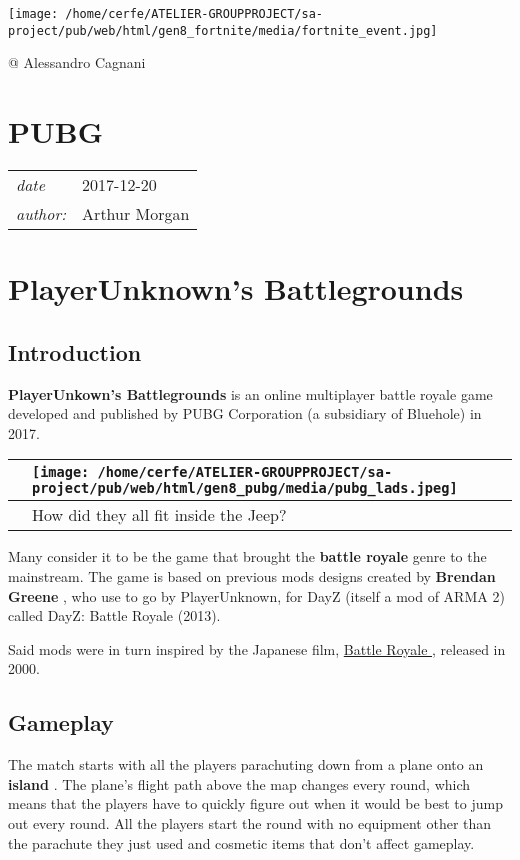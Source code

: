 \documentclass[a4paper,10pt]{book}
\newcommand{\pageHeader}[4]{
    \section{#1}
    \vspace{-0.3cm}
    \begin{table}[h!]
     \begin{tabular}{ll}
        \hline
        \textit{date} & #2 \\
        \textit{author: } & #3\\
        \hline
     \end{tabular}
    \end{table}
    \vspace{-0.3cm}
}
\begin{document}
 
 \texttt{[image: /home/cerfe/ATELIER-GROUPPROJECT/sa-project/pub/web/html/gen8\_fortnite/media/fortnite\_event.jpg]}
 
 
 @ Alessandro Cagnani 
 
 
 \newpage\pageHeader{PUBG}{2017-12-20}{Arthur Morgan}{The game that brought battle royale to the mainstream, PlayerUnknown's Battlegrounds}
 \section{PlayerUnknown's Battlegrounds }
 \subsection{Introduction }
 
 \textbf{PlayerUnkown's Battlegrounds }  is an online multiplayer battle royale game developed and published by PUBG Corporation (a subsidiary of Bluehole) in 2017.
         
 \begin{longtable}{p{1mm}|l|}\hline
 
 & \texttt{[image: /home/cerfe/ATELIER-GROUPPROJECT/sa-project/pub/web/html/gen8\_pubg/media/pubg\_lads.jpeg]}
 \\\hline
 
 & How did they all fit inside the Jeep? 
 \\\hline
 \end{longtable}
 
      Many consider it to be the game that brought the  \textbf{battle royale }  genre to the mainstream. The game is based on previous mods designs created by  \textbf{Brendan Greene } , who use to go by PlayerUnknown, for DayZ (itself a mod of ARMA 2) called DayZ: Battle Royale (2013).
   
    Said mods were in turn inspired by the Japanese film,  \href{https://en.wikipedia.org/wiki/Battle_Royale_(film)}{Battle Royale }, released in 2000.
   
 
 \subsection{Gameplay }
 
        The match starts with all the players parachuting down from a plane onto an  \textbf{island } .
        The plane's flight path above the map changes every round, which means that the players have to quickly figure out when it would be best to jump out every round.
        All the players start the round with no equipment other than the parachute they just used and cosmetic items that don't affect gameplay.
       
\end{document}
